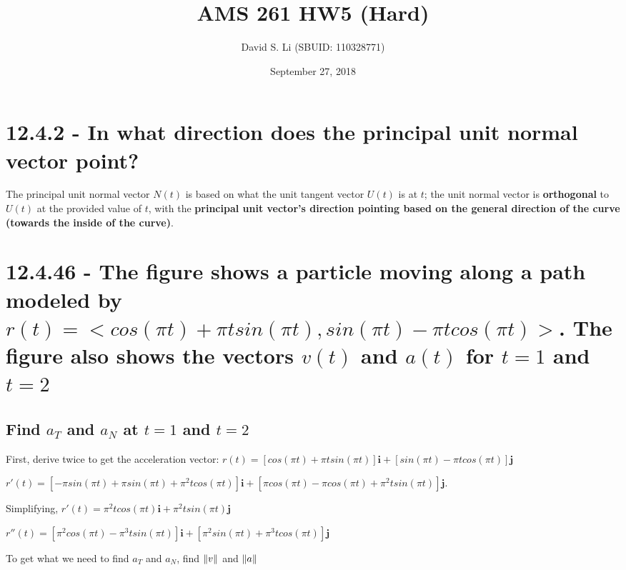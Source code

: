 \documentclass{article}
\title{AMS 261 HW5 (Hard)}
\author{David S. Li (SBUID: 110328771)}
\date{September 27, 2018}
\begin{document}
\maketitle

\section{12.4.2 - In what direction does the principal unit normal vector point?}
\par\noindent\large The principal unit normal vector $N(t)$ is based on what the unit tangent vector $U(t)$ is at $t$; the unit normal vector is \textbf{orthogonal} to $U(t)$ at the provided value of $t$, with the \textbf{principal unit vector's direction pointing based on the general direction of the curve (towards the inside of the curve)}.
\section{12.4.46 - The figure shows a particle moving along a path modeled by $r(t) = <cos(\pi t) + \pi tsin(\pi t), sin(\pi t) - \pi tcos(\pi t)>$.  The figure also shows the vectors $v(t)$ and $a(t)$ for $t = 1$ and $t = 2$}

\subsection{Find $a_{T}$ and $a_{N}$ at $t = 1$ and $t = 2$}
\par\noindent\large First, derive twice to get the acceleration vector: $r(t) = [cos(\pi t) + \pi tsin(\pi t)]\textbf{i} + [sin(\pi t) - \pi tcos(\pi t)]\textbf{j}$\vspace{0.10cm}
\par\noindent\large $r'(t) = [-\pi sin(\pi t) + \pi sin(\pi t) + \pi^{2}tcos(\pi t)]\textbf{i} + [\pi cos(\pi t) - \pi cos(\pi t) + \pi^{2}tsin(\pi t)]\textbf{j} $.\vspace{0.10cm}
\par\noindent Simplifying, $r'(t) = \pi^{2}tcos(\pi t)\textbf{i} + \pi^{2}tsin(\pi t)\textbf{j}$\vspace{0.10cm}
\par\noindent $r''(t) = [\pi^{2}cos(\pi t) - \pi^{3}tsin(\pi t)]\textbf{i} + [\pi^{2}sin(\pi t) + \pi^{3}tcos(\pi t)]\textbf{j}$\vspace{0.25cm}

\par\noindent To get what we need to find $a_{T}$ and $a_{N}$, find $\norm{v}$ and $\norm{a}$ \vspace{0.10cm}
\end{document}
